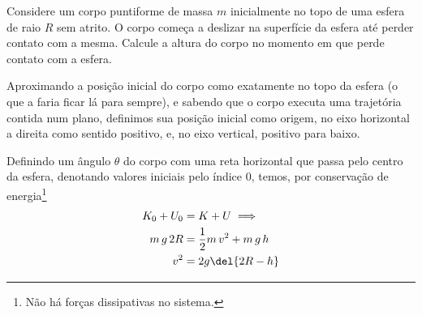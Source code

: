 \documentclass[]{IMTexam}
\begin{document}
\begin{questions}

	\clearpage

	\question Considere um corpo puntiforme de massa $ m $ inicialmente no topo de uma esfera de raio $ R $ sem atrito. O corpo começa a deslizar na superfície da esfera até perder contato com a mesma. Calcule a altura do corpo no momento em que perde contato com a esfera.

	\begin{solution}

		\begin{multi}
			Aproximando a posição inicial do corpo como exatamente no topo da esfera (o que a faria ficar lá para sempre), e sabendo que o corpo executa uma trajetória contida num plano, definimos sua posição inicial como origem, no eixo horizontal a direita como sentido positivo, e, no eixo vertical, positivo para baixo.

			Definindo um ângulo $ \theta $ do corpo com uma reta horizontal que passa pelo centro da esfera, denotando valores iniciais pelo índice $ 0 $, temos, por conservação de energia\footnote{Não há forças dissipativas no sistema.}
			\begin{align}
				K_0+U_0  & =K+U\implies                     \\
				m\,g\,2R & =\dfrac{1}{2}m\,v^{2}+m\,g\,h    \\
				v^{2}    & =2g\del{2R-h}\label{eq:v2circle}
			\end{align}


\end{multi}
\end{solution}
\end{questions}
\end{document}
